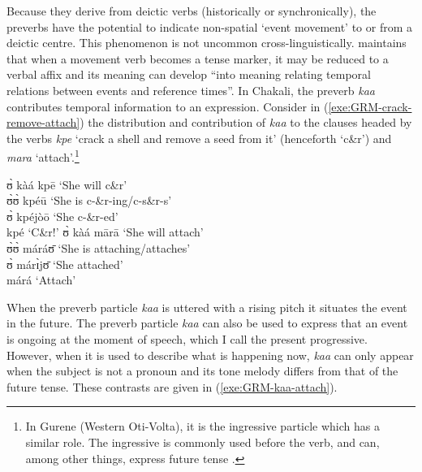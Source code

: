\begin{exe}
\begin{exe}
\begin{exe}
{\begin{exe}
\begin{exe}
\begin{exe}
\begin{exe}
\begin{exe}
\begin{exe}
\begin{exe}
\begin{xlist}
\begin{exe}
\begin{exe}
\begin{exe}
\begin{exe}
\begin{exe}
\begin{exe}
\begin{exe}
\begin{exe}
\begin{exe}
\begin{exe}
\begin{exe}
\begin{exe}
\begin{exe}
 
\z 
 \z


Because they derive from deictic verbs (historically or synchronically),  the
preverbs have the potential to indicate non-spatial  `event movement'  to or 
from a deictic centre.
This phenomenon is not uncommon cross-linguistically. \citet[62]{Nico07}
maintains  that when a movement verb becomes a tense marker, it may be reduced
to a verbal affix and its meaning can develop ``into meaning relating temporal
relations between events and reference times''. In Chakali, the  preverb {\it 
kaa} contributes   temporal information to an expression. Consider in
(\ref{exe:GRM-crack-remove-attach}) the distribution and contribution of  {\it 
kaa} to  the clauses headed by the verbs {\it kpe} `crack a shell and remove a
seed from it' (henceforth `c\&r') and {\it mara} `attach'.\footnote{In Gurene 
(Western Oti-Volta), it
is the ingressive particle which has a similar role. The ingressive  is 
commonly used before the verb, and can, among other things,  express future
tense \citep[see][59]{Daku07b}.}



\ea\label{exe:GRM-crack-remove-attach}

\ea

 ʊ̀ kàá kpē  {\rm  `She will c\&r'} \\
   ʊ̀ʊ̀ kpéū  {\rm     `She  is c-\&r-ing/c-s\&r-s'}\\
   ʊ̀ kpéjòō   {\rm `She   c-\&r-ed'}\\
   kpé       {\rm  `C\&r!'}
\ex
 ʊ̀ kàá mārā   {\rm   `She will attach'}\\
   ʊ̀ʊ̀ máráʊ̄     {\rm  `She  is attaching/attaches'}\\
  ʊ̀ márɪ̀jʊ̄    {\rm `She   attached'}\\
   márá     {\rm  `Attach'}

\z
\z

When the preverb particle {\it kaa} is uttered with a rising pitch it situates 
the event in the future. The preverb particle {\it kaa} can also be used to 
express that an event is
ongoing at the moment of speech, which I call the present 
progressive.   However,  when it is used to describe what is happening
now, {\it kaa} can only appear when the subject is not a pronoun and its tone
melody differs from that of the future tense. These contrasts are given in
(\ref{exe:GRM-kaa-attach}).


\end{exe}
\end{exe}
\end{exe}
\end{exe}
\end{exe}
\end{exe}
\end{exe}
\end{exe}
\end{exe}
\end{exe}
\end{exe}
\end{exe}
\end{exe}
\end{xlist}
\end{exe}
\end{exe}
\end{exe}
\end{exe}
\end{exe}
\end{exe}
\end{exe}}
\end{exe}
\end{exe}
\end{exe}
